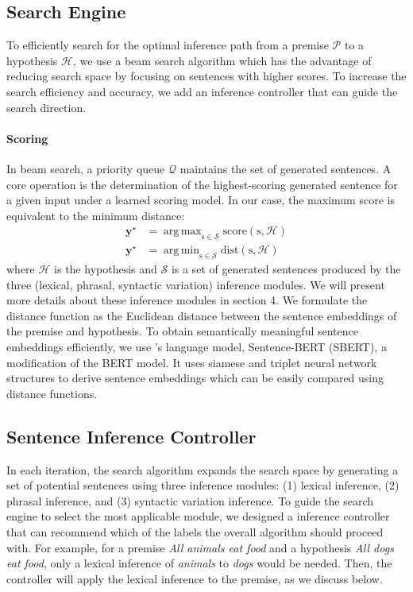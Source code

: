 \documentclass[11pt,a4paper]{article}
\DeclareMathOperator*{\argmax}{arg\,max}
\DeclareMathOperator*{\argmin}{arg\,min}
\newcommand{\yy}{\mathbf{y}}
\newcommand{\calH}{\mathcal{H}}
\newcommand{\calP}{\mathcal{P}}
\newcommand{\calS}{\mathcal{S}}
\newcommand{\calQ}{\mathcal{Q}}
\newcommand{\score}{\mathrm{score}}
\begin{document}
\subsection{Search Engine}
To efficiently search for the optimal inference path from a premise $\calP$ to a hypothesis $\calH$, we use a beam search algorithm which has the advantage of reducing search space by focusing on sentences with higher scores. To increase the search efficiency and accuracy, we add an inference controller that can guide the search direction. 

\paragraph{Scoring}
In beam search, a priority queue $\calQ$ maintains the set of generated sentences. A core operation is the determination of the highest-scoring generated sentence for a given input under a learned scoring model. In our case, the maximum score is equivalent to the minimum distance:
\begin{align*}
    \yy^\star &= \argmax_{\mathrm{s} \in \calS} \score(\mathrm{s}, \calH) \\
    \yy^\star &= \argmin_{\mathrm{s} \in \calS} \mathrm{dist}(\mathrm{s},\calH)
\end{align*}
where $\calH$ is the hypothesis and $\mathcal{S}$ is a set of generated sentences produced by the three (lexical, phrasal, syntactic variation) inference modules. We will present more details about these inference modules in section 4. 
We formulate the distance function as the Euclidean distance between the sentence embeddings of the premise and hypothesis. To obtain semantically meaningful sentence embeddings efficiently, we use \citet{reimers-gurevych-2019-sentence}'s language model, Sentence-BERT (SBERT), a modification of the BERT model. It uses siamese and triplet neural network structures to derive sentence embeddings which can be easily compared using distance functions. 









\subsection{Sentence Inference Controller}
In each iteration, the search algorithm expands the search space by generating a set of potential sentences using three inference modules: (1) lexical inference, (2) phrasal inference, and (3) syntactic variation inference. To guide the search engine to select the most applicable module, we designed a inference controller that can recommend 
which of the labels the overall algorithm should proceed with. 
For example, for a premise
\textit{All animals eat food} and a hypothesis \textit{All dogs eat food}, only a lexical inference  of \textit{animals} to  \textit{dogs} would be needed. Then, the controller will apply the lexical inference  to the premise, as we discuss below.
\end{document}
